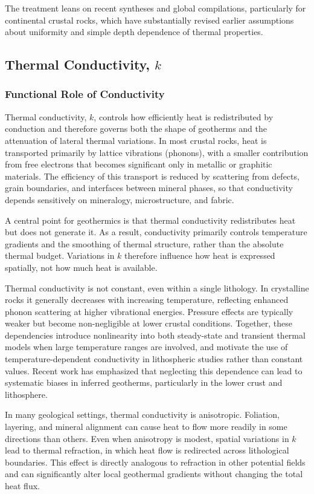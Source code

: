 The treatment leans on recent syntheses and global compilations, particularly for continental crustal rocks, which have substantially revised earlier assumptions about uniformity and simple depth dependence of thermal properties.


\subsection{Thermal Conductivity, $k$}
\subsubsection{Functional Role of Conductivity}
Thermal conductivity, $k$, controls how efficiently heat is redistributed by conduction and therefore governs both the shape of geotherms and the attenuation of lateral thermal variations. In most crustal rocks, heat is transported primarily by lattice vibrations (phonons), with a smaller contribution from free electrons that becomes significant only in metallic or graphitic materials. The efficiency of this transport is reduced by scattering from defects, grain boundaries, and interfaces between mineral phases, so that conductivity depends sensitively on mineralogy, microstructure, and fabric.

A central point for geothermics is that thermal conductivity redistributes heat but does not generate it. As a result, conductivity primarily controls temperature gradients and the smoothing of thermal structure, rather than the absolute thermal budget. Variations in $k$ therefore influence how heat is expressed spatially, not how much heat is available.

Thermal conductivity is not constant, even within a single lithology. In crystalline rocks it generally decreases with increasing temperature, reflecting enhanced phonon scattering at higher vibrational energies. Pressure effects are typically weaker but become non-negligible at lower crustal conditions. Together, these dependencies introduce nonlinearity into both steady-state and transient thermal models when large temperature ranges are involved, and motivate the use of temperature-dependent conductivity in lithospheric studies rather than constant values. Recent work has emphasized that neglecting this dependence can lead to systematic biases in inferred geotherms, particularly in the lower crust and lithosphere.

In many geological settings, thermal conductivity is anisotropic. Foliation, layering, and mineral alignment can cause heat to flow more readily in some directions than others. Even when anisotropy is modest, spatial variations in $k$ lead to thermal refraction, in which heat flow is redirected across lithological boundaries. This effect is directly analogous to refraction in other potential fields and can significantly alter local geothermal gradients without changing the total heat flux.

